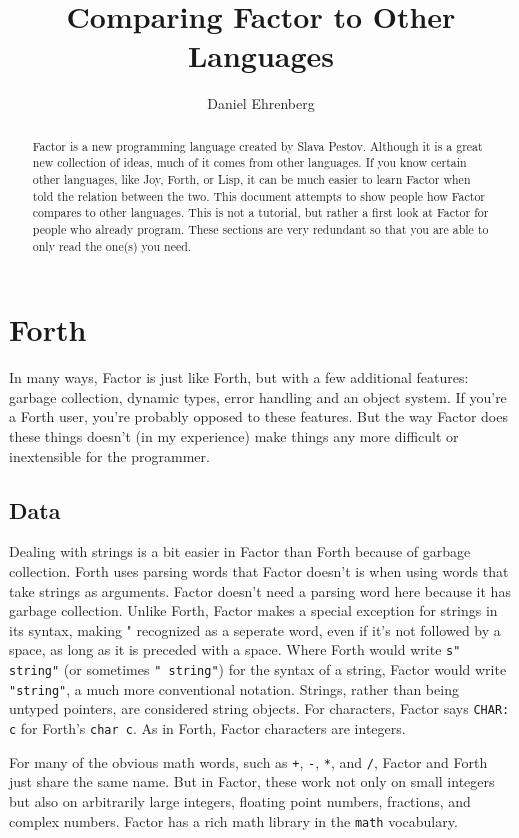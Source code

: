 \documentclass{article}
\author{Daniel Ehrenberg}
\title{Comparing Factor to Other Languages}
\begin{document}
\maketitle

\begin{abstract}
Factor is a new programming language created by Slava Pestov. Although it is a great new collection of ideas, much of it comes from other languages. If you know certain other languages, like Joy, Forth, or Lisp, it can be much easier to learn Factor when told the relation between the two. This document attempts to show people how Factor compares to other languages. This is not a tutorial, but rather a first look at Factor for people who already program. These sections are very redundant so that you are able to only read the one(s) you need.
\end{abstract}

\section{Forth}

In many ways, Factor is just like Forth, but with a few additional features: garbage collection, dynamic types, error handling and an object system. If you're a Forth user, you're probably opposed to these features. But the way Factor does these things doesn't (in my experience) make things any more difficult or inextensible for the programmer.

\subsection{Data}

Dealing with strings is a bit easier in Factor than Forth because of garbage collection. Forth uses parsing words that Factor doesn't is when using words that take strings as arguments. Factor doesn't need a parsing word here because it has garbage collection. Unlike Forth, Factor makes a special exception for strings in its syntax, making " recognized as a seperate word, even if it's not followed by a space, as long as it is preceded with a space. Where Forth would write \verb|s" string"| (or sometimes \verb|" string"|) for the syntax of a string, Factor would write \verb|"string"|, a much more conventional notation. Strings, rather than being untyped pointers, are considered string objects. For characters, Factor says \verb|CHAR: c| for Forth's \verb|char c|. As in Forth, Factor characters are integers.

For many of the obvious math words, such as \texttt{+}, \texttt{-}, \texttt{*}, and \texttt{/}, Factor and Forth just share the same name. But in Factor, these work not only on small integers but also on arbitrarily large integers, floating point numbers, fractions, and complex numbers. Factor has a rich math library in the \verb|math| vocabulary.
\end{document}
